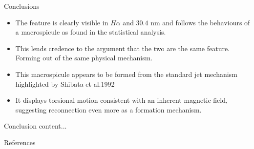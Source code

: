 \documentclass{beamer}
\begin{document}
	\begin{frame}{Conclusions}
		\begin{itemize}
			\item{The feature is clearly visible in $H\alpha$ and $30.4$ nm and follows the behaviours of a macrospicule as found in the statistical analysis.}
			\item{This lends credence to the argument that the two are the same feature. Forming out of the same physical mechanism.}
			\item{This macrospicule appears to be formed from the standard jet mechanism highlighted by Shibata et al.1992}
			\item{It displays torsional motion consistent with an inherent magnetic field, suggesting reconnection even more as a formation mechanism.}
		\end{itemize}
	\end{frame}



	\begin{frame}{Conclusion}
	content...
	\end{frame}

	\begin{frame}{References}
	\tiny
	
	
	\end{frame}
\end{document}
